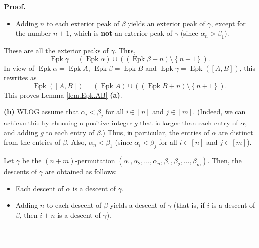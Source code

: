 \documentclass[numbers=enddot,12pt,final,onecolumn,notitlepage]{scrartcl}%
\theoremstyle{definition}
\newenvironment{proof}[1][Proof]{\noindent\textbf{#1.} }{\ \rule{0.5em}{0.5em}}
\newenvironment{verlong}{}{}
\begin{document}
\begin{verlong}
\begin{proof}
\begin{itemize}
\item Adding $n$ to each exterior peak of $\beta$ yields an exterior peak of
$\gamma$, except for the number $n+1$, which is \textbf{not} an exterior peak
of $\gamma$ (since $\alpha_{n}>\beta_{1}$).
\end{itemize}

These are all the exterior peaks of $\gamma$. Thus,%
\[
\operatorname{Epk}\gamma=\left(  \operatorname{Epk}\alpha\right)
\cup\left(  \left(  \operatorname{Epk}\beta+n\right)  \setminus\left\{
n+1\right\}  \right)  .
\]
In view of $\operatorname{Epk}\alpha=\operatorname{Epk}A$,
$\operatorname{Epk}\beta=\operatorname{Epk}B$ and $\operatorname{Epk}%
\gamma=\operatorname{Epk}\left(  \left[  A,B\right]  \right)  $, this
rewrites as
\[
\operatorname{Epk}\left(  \left[  A,B\right]  \right)  =\left(
\operatorname{Epk}A\right)  \cup\left(  \left(  \operatorname{Epk}%
B+n\right)  \setminus\left\{  n+1\right\}  \right)  .
\]
This proves Lemma \ref{lem.Epk.AB} \textbf{(a)}.

\textbf{(b)} WLOG assume that $\alpha_{i}<\beta_{j}$ for all $i\in\left[
n\right]  $ and $j\in\left[  m\right]  $. (Indeed, we can achieve this by
choosing a positive integer $g$ that is larger than each entry of $\alpha$,
and adding $g$ to each entry of $\beta$.) Thus, in particular, the entries of
$\alpha$ are distinct from the entries of $\beta$. Also, $\alpha_{n}<\beta
_{1}$ (since $\alpha_{i}<\beta_{j}$ for all $i\in\left[  n\right]  $ and
$j\in\left[  m\right]  $).

Let $\gamma$ be the $\left(  n+m\right)  $-permutation $\left(  \alpha
_{1},\alpha_{2},\ldots,\alpha_{n},\beta_{1},\beta_{2},\ldots,\beta_{m}\right)
$. Then, the descents of $\gamma$ are obtained as follows:

\begin{itemize}
\item Each descent of $\alpha$ is a descent of $\gamma$.

\item Adding $n$ to each descent of $\beta$ yields a descent of $\gamma$ (that
is, if $i$ is a descent of $\beta$, then $i+n$ is a descent of $\gamma$).
\end{itemize}


\end{proof}
\end{verlong}
\end{document}
